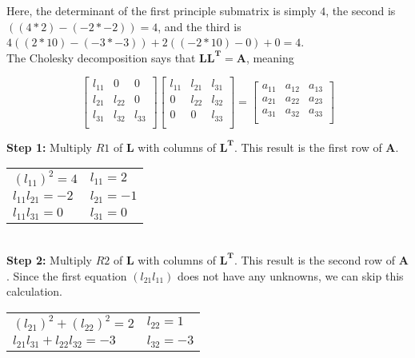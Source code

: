 \documentclass[11pt]{article}
\begin{document}
\begin{enumerate}
		Here, the determinant of the first principle submatrix is simply $4$, the second is $((4*2)-(-2*-2)) = 4$, and the third
		is $4((2*10)-(-3*-3)) + 2((-2 * 10)-0) + 0 = 4$. \\

		The Cholesky decomposition says that $\mathbf{LL^T = A}$, meaning

		\[
			\begin{bmatrix}
				l_{11} & 0 & 0 \\
				l_{21} & l_{22} & 0 \\
				l_{31} & l_{32} & l_{33} \\
			\end{bmatrix}
			\begin{bmatrix}
				l_{11} & l_{21} & l_{31} \\
				0 & l_{22} & l_{32} \\
				0 & 0 & l_{33} \\
			\end{bmatrix}
			=
			\begin{bmatrix}
				a_{11} & a_{12} & a_{13} \\
				a_{21} & a_{22} & a_{23} \\
				a_{31} & a_{32} & a_{33} \\
			\end{bmatrix}
		\]

		\textbf{Step 1:} Multiply $R1$ of $\mathbf{L}$ with columns of $\mathbf{L^T}$. This result is the first row of $\mathbf{A}$.

		\begin{tabular}{ll}
			$(l_{11})^2 = 4$ & $l_{11} = 2$ \\

			$l_{11}l_{21} = -2$ & $l_{21} = -1$ \\

			$l_{11}l_{31} = 0$ & $l_{31} = 0$ \\
		\end{tabular} \\

		\textbf{Step 2:} Multiply $R2$ of $\mathbf{L}$ with columns of $\mathbf{L^T}$. This result is the second row of $\mathbf{A}$.
		Since the first equation $(l_{21}l_{11})$ does not have any unknowns, we can skip this calculation.

		\begin{tabular}{ll}
			$(l_{21})^2 + (l_{22})^2 = 2$ & $l_{22} = 1$ \\

			$l_{21}l_{31} + l_{22}l_{32} = -3$ & $l_{32} = -3$ \\
		\end{tabular} \\


\end{enumerate}
\end{document}
